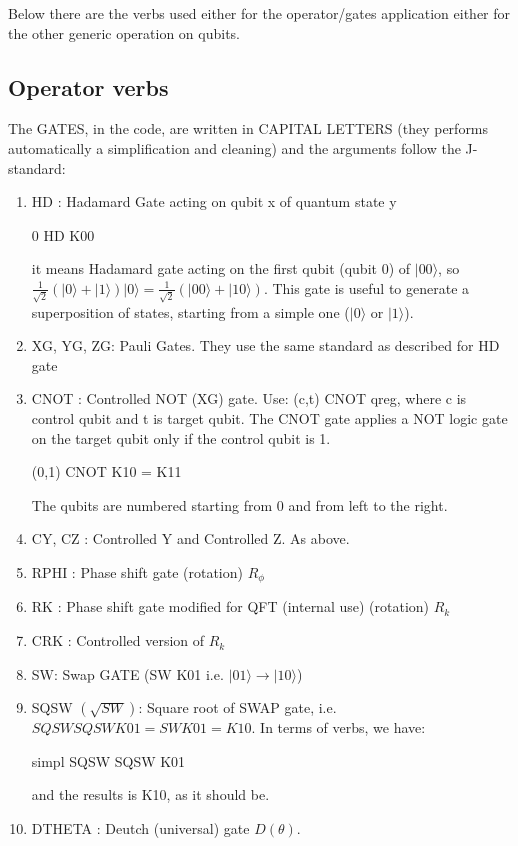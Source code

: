 \documentclass[a4paper,11pt]{amsbook}
\begin{document}
Below there are the verbs used either for the operator/gates application either for the other generic operation on qubits.

\subsection{Operator verbs}

The GATES, in the code, are written in CAPITAL LETTERS (they performs automatically a simplification and cleaning) and the arguments follow the J-standard:
\begin{enumerate}
\item HD : Hadamard Gate acting on qubit x of quantum state y
\begin{center}
 0 HD K00
\end{center}
it means Hadamard gate acting on the first qubit (qubit 0) of $|00\rangle$, so $\frac{1}{\sqrt{2}}(|0\rangle  + |1\rangle )|0\rangle  = \frac{1}{\sqrt{2}}(|00\rangle  + |10\rangle )$. This gate is useful to generate a superposition of states, starting from a simple one ($|0\rangle$ or $|1\rangle$).
\item XG, YG, ZG: Pauli Gates. They use the same standard as described for HD gate
\item CNOT : Controlled NOT (XG) gate. Use: (c,t) CNOT qreg, where c is control qubit and t is target qubit. The CNOT gate applies a NOT logic gate on the target qubit only if the control qubit is 1.
\begin{center}
(0,1) CNOT K10 = K11
\end{center}
The qubits are numbered starting from 0 and from left to the right.
\item CY, CZ : Controlled Y and Controlled Z. As above.
\item RPHI : Phase shift gate (rotation) $R_\phi$
\item RK : Phase shift gate modified for QFT (internal use) (rotation) $R_k$
\item CRK : Controlled version of $R_k$
\item SW: Swap GATE (SW K01 i.e. $|01\rangle \rightarrow |10\rangle$)
\item SQSW $\left(\sqrt{SW}\right)$: Square root of SWAP gate, i.e. $SQSW SQSW K01 = SW K01 = K10$. In terms of verbs, we have:
\begin{center}
simpl SQSW SQSW K01
\end{center} and the results is K10, as it should be.
\item DTHETA : Deutch (universal) gate $D(\theta)$.
\end{enumerate}
\end{document}
